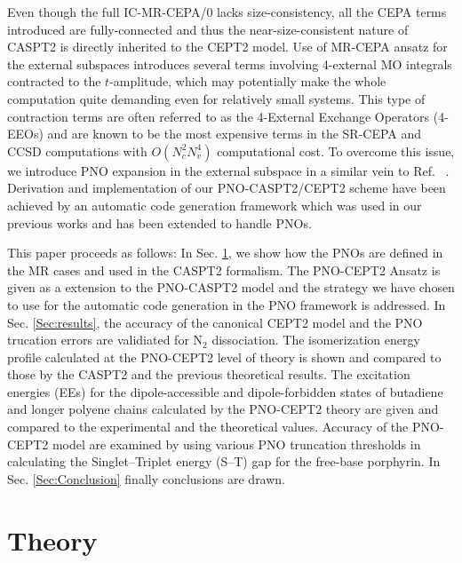 \documentclass[aip,jcp,amsmath]{revtex4-1}
\begin{document}
%
Even though the full IC-MR-CEPA/0 lacks size-consistency, all the CEPA terms introduced are fully-connected and thus the near-size-consistent nature of CASPT2 is directly inherited to the CEPT2 model.
%
%
Use of MR-CEPA ansatz for the external subspaces introduces several terms involving 4-external MO integrals contracted to the $t$-amplitude, which may potentially make the whole computation quite demanding even for relatively small systems.
%
This type of contraction terms are often referred to as the 4-External Exchange Operators (4-EEOs) and are known to be the most expensive terms in the SR-CEPA and CCSD computations with $O(N_c^2 N_v^4)$ computational cost.
%
To overcome this issue, we introduce PNO expansion in the external subspace in a similar vein to Ref. ~.
%
Derivation and implementation of our PNO-CASPT2/CEPT2 scheme have been achieved by an automatic code generation framework which was used in our previous works\cite{saitowmultireference2013,doi:10.1021/acs.jctc.5b00270} and has been extended to handle PNOs.

%
This paper proceeds as follows:
%
In Sec. \ref{Sec:theory}, we show how the PNOs are defined in the MR cases and used in the CASPT2 formalism.
%
The PNO-CEPT2 Ansatz is given as a extension to the PNO-CASPT2 model and the strategy we have chosen to use for the automatic code generation in the PNO framework is addressed.
%
In Sec. \ref{Sec:results}, the accuracy of the canonical CEPT2 model and the PNO trucation errors are validiated for N${}_2$ dissociation.
%
The isomerization energy profile calculated at the PNO-CEPT2 level of theory is shown and compared to those by the CASPT2 and the previous theoretical results.
%
The excitation energies (EEs) for the dipole-accessible and dipole-forbidden states of butadiene and longer polyene chains calculated by the PNO-CEPT2 theory are given and compared to the experimental and the theoretical values.
%
Accuracy of the PNO-CEPT2 model are examined by using various PNO truncation thresholds in calculating the Singlet--Triplet energy (S--T) gap for the free-base porphyrin.
%
In Sec. \ref{Sec:Conclusion} finally conclusions are drawn.

\section{Theory}\label{Sec:theory}
\end{document}
